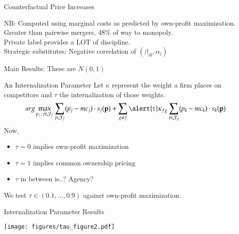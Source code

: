 \begin{frame}[plain, label=merger]{Counterfactual Price Increases}
\begin{center}
\scalebox{0.75}{

}
\end{center}
\vspace{1cm}
NB: Computed using marginal costs as predicted by own-profit maximization.\\
Greater than pairwise mergers, 48\% of way to monopoly.\\
Private label provides a LOT of discipline.\\
Strategic substitutes: Negative correlation of $(\beta_{i0}, \alpha_{i})$
\end{frame}


\begin{frame}[plain,label=mainresults]{Main Results: These are $N(0,1)$}
\begin{center}
\scalebox{0.5}{}
\end{center}
\end{frame}

\begin{frame}[plain]{An Internalization Parameter}
Let $\kappa$ represent the weight a firm places on competitors and $\tau$ the internalization of those weights.
 \begin{equation*}
 arg\max_{p_j \,:\, j \in \mathcal{J}_f} \sum_{j \in \mathcal{J}_f} (p_j - mc_j) \cdot s_j(\mathbf{p})+
 \sum_{g\neq f} \alert{\tau} \kappa_{fg} \sum_{j \in \mathcal{J}_g} (p_k - mc_k) \cdot s_k(\mathbf{p})
 \end{equation*}
Now, 
\begin{itemize}
\item $\tau = 0$ implies own-profit maximization
\item $\tau = 1$ implies common ownership pricing
\item $\tau$ in between is..? Agency?
\end{itemize}
We test $\tau \in (0.1, \ldots, 0.9)$ against own-profit maximization.
\end{frame}

\begin{frame}[plain]{Internalization Parameter Results}
\begin{center}
\texttt{[image: figures/tau\_figure2.pdf]}
\end{center}
\end{frame}


